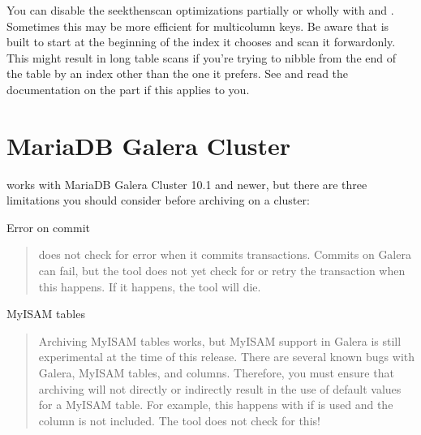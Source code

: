 \documentclass[letterpaper,10pt,english]{sphinxmanual}
\begin{document}
You can disable the seek\sphinxhyphen{}then\sphinxhyphen{}scan optimizations partially or wholly with
{\hyperref[\detokenize{mariadb-archiver:cmdoption-mariadb-archiver-no-ascend}]{}} and {\hyperref[\detokenize{mariadb-archiver:cmdoption-mariadb-archiver-ascend-first}]{}}.  Sometimes this may be more efficient
for multi\sphinxhyphen{}column keys.  Be aware that  is built to start at the
beginning of the index it chooses and scan it forward\sphinxhyphen{}only.  This might result
in long table scans if you’re trying to nibble from the end of the table by an
index other than the one it prefers.  See {\hyperref[\detokenize{mariadb-archiver:cmdoption-mariadb-archiver-source}]{}} and read the
documentation on the  part if this applies to you.


\section{MariaDB Galera Cluster}
\label{\detokenize{mariadb-archiver:mariadb-galera-cluster}}
 works with MariaDB Galera Cluster 10.1 and newer,
but there are three limitations you should consider before archiving on
a cluster:

Error on commit
\begin{quote}

 does not check for error when it commits transactions.
Commits on Galera can fail, but the tool does not yet check for or retry the
transaction when this happens.  If it happens, the tool will die.
\end{quote}

MyISAM tables
\begin{quote}

Archiving MyISAM tables works, but MyISAM support in Galera is still
experimental at the time of this release.  There are several known bugs with
Galera, MyISAM tables, and  columns.  Therefore, you must ensure
that archiving will not directly or indirectly result in the use of default
 values for a MyISAM table.  For example, this happens with
{\hyperref[\detokenize{mariadb-archiver:cmdoption-mariadb-archiver-dest}]{}} if {\hyperref[\detokenize{mariadb-archiver:cmdoption-mariadb-archiver-columns}]{}} is used and the  column is not
included.  The tool does not check for this!
\end{quote}
\end{document}
